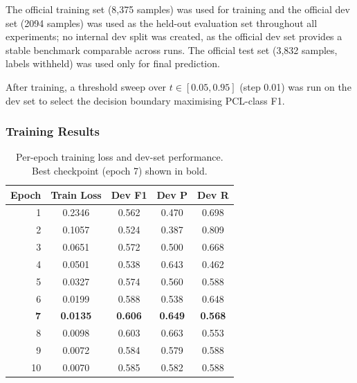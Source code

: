 \documentclass[11pt,a4paper]{article}
\begin{document}
The official training set (8,375 samples) was used for training and the official dev set (2094 samples) was used as the held-out evaluation set throughout all experiments; no internal dev split was created, as the official dev set provides a stable benchmark comparable across runs. The official test set (3,832 samples, labels withheld) was used only for final prediction.

After training, a threshold sweep over $t \in [0.05, 0.95]$ (step 0.01) was run on the dev set to select the decision boundary maximising PCL-class F1.

\subsubsection{Training Results}

\begin{table}[H]
    \centering
    \begin{tabular}{rcccc}
        \toprule
        \textbf{Epoch} & \textbf{Train Loss} & \textbf{Dev F1} & \textbf{Dev P} & \textbf{Dev R} \\
        \midrule
        1              & 0.2346              & 0.562           & 0.470          & 0.698          \\
        2              & 0.1057              & 0.524           & 0.387          & 0.809          \\
        3              & 0.0651              & 0.572           & 0.500          & 0.668          \\
        4              & 0.0501              & 0.538           & 0.643          & 0.462          \\
        5              & 0.0327              & 0.574           & 0.560          & 0.588          \\
        6              & 0.0199              & 0.588           & 0.538          & 0.648          \\
        \textbf{7}     & \textbf{0.0135}     & \textbf{0.606}  & \textbf{0.649} & \textbf{0.568} \\
        8              & 0.0098              & 0.603           & 0.663          & 0.553          \\
        9              & 0.0072              & 0.584           & 0.579          & 0.588          \\
        10             & 0.0070              & 0.585           & 0.582          & 0.588          \\
        \bottomrule
    \end{tabular}
    \caption{Per-epoch training loss and dev-set performance. Best checkpoint (epoch 7) shown in bold.}
    \label{tab:training}
\end{table}
\end{document}
